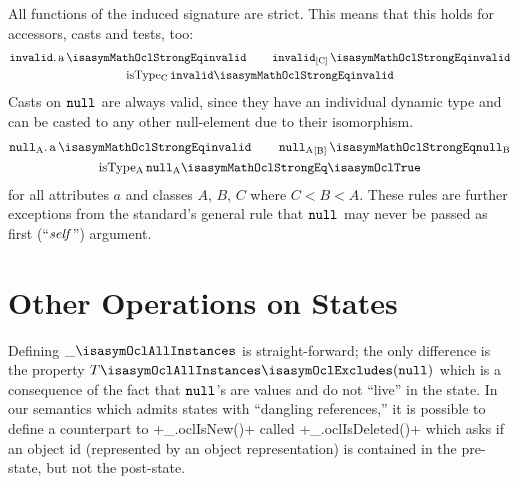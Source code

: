 All functions of the induced signature are strict.  This means that this holds
for accessors, casts and tests, too:
\begin{multline*}
  \getAttrib{\isasymOclUndefined}{a} \isasymMathOclStrongEq \isasymOclUndefined
  \qquad
  \typeCast{\isasymOclUndefined}{C} \isasymMathOclStrongEq \isasymOclUndefined
  \\
  \isType{C}{\isasymOclUndefined} \isasymMathOclStrongEq \isasymOclUndefined
\end{multline*}
Casts on ${\mathtt{null}_\text{{}}}$ are always valid, since they have an
individual dynamic type and can be casted to any other null-element due to their
isomorphism.
\begin{multline*}
  \getAttrib{\Null{A}}{a} \isasymMathOclStrongEq \isasymOclUndefined
  \qquad
  \typeCast{\Null{A}}{B} \isasymMathOclStrongEq \Null{B}
  \\%
  \isType{A}{\Null{A}} \isasymMathOclStrongEq \isasymOclTrue
\end{multline*}
for all attributes $a$ and classes $A$, $B$, $C$ where $C<B<A$. These rules are
further exceptions from the standard's general rule that ${\mathtt{null}_\text{{}}}$ may never be
passed as first (``$\mathit{self}$'') argument.

\section{Other Operations on States}
Defining $\_\isasymOclAllInstances$
is straight-forward; the only difference is the property
$T\isasymOclAllInstances\isasymOclExcludes(\isasymOclNull)$ which is a
consequence of the fact that ${\mathtt{null}_\text{{}}}$'s are values and do not ``live'' in the
state.  In our semantics which admits states with ``dangling references,'' it is
possible to define a counterpart to \inlineocl+_.oclIsNew()+ called
\inlineocl+_.oclIsDeleted()+ which asks if an object id (represented by an object
representation) is contained in the pre-state, but not the post-state.

